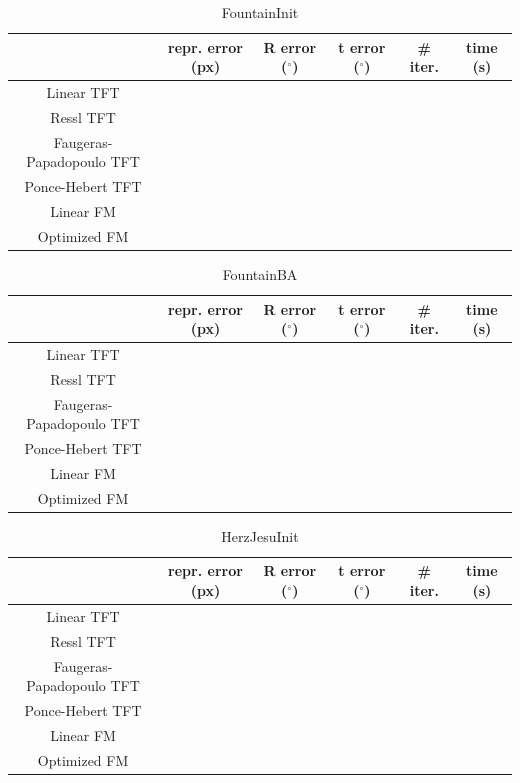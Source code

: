 \begin{table}[htbp]
  \centering
  \caption{FountainInit}
  \label{tab:fountainInit}
  \begin{tabular}{|*{6}{c}|}
    \hline
     & repr. error (px) & R error ($^{\circ}$) & t error ($^{\circ}$) & \# iter. & time (s)\\
    \hline
    Linear TFT & & & & & \\
    \hline
    Ressl TFT & & & & & \\
    \hline
    Faugeras-Papadopoulo TFT & & & & & \\
    \hline
    Ponce-Hebert TFT & & & & & \\
    \hline
    Linear FM & & & & & \\
    \hline
    Optimized FM & & & & & \\
    \hline
  \end{tabular}
\end{table}

\begin{table}[htbp]
  \centering
  \caption{FountainBA}
  \label{tab:fountainBA}
  \begin{tabular}{|*{6}{c}|}
    \hline
     & repr. error (px) & R error ($^{\circ}$) & t error ($^{\circ}$) & \# iter. & time (s)\\
    \hline
    Linear TFT & & & & & \\
    \hline
    Ressl TFT & & & & & \\
    \hline
    Faugeras-Papadopoulo TFT & & & & & \\
    \hline
    Ponce-Hebert TFT & & & & & \\
    \hline
    Linear FM & & & & & \\
    \hline
    Optimized FM & & & & & \\
    \hline
  \end{tabular}
\end{table}

\begin{table}[htbp]
  \centering
  \caption{HerzJesuInit}
  \label{tab:HerzJesuInit}
  \begin{tabular}{|*{6}{c}|}
    \hline
     & repr. error (px) & R error ($^{\circ}$) & t error ($^{\circ}$) & \# iter. & time (s)\\
    \hline
    Linear TFT & & & & & \\
    \hline
    Ressl TFT & & & & & \\
    \hline
    Faugeras-Papadopoulo TFT & & & & & \\
    \hline
    Ponce-Hebert TFT & & & & & \\
    \hline
    Linear FM & & & & & \\
    \hline
    Optimized FM & & & & & \\
    \hline
  \end{tabular}
\end{table}

